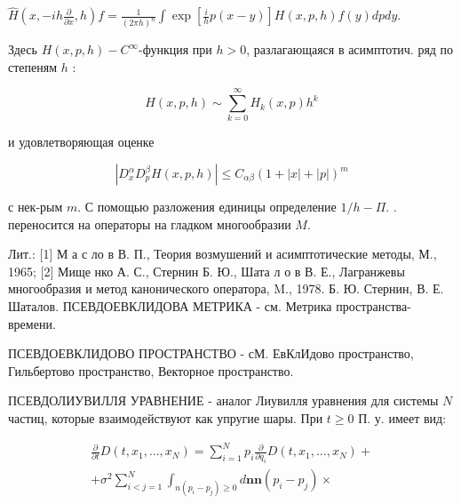 \documentclass[10pt]{article}
\begin{document}
$\hat{H}\left(x,-i h \frac{\partial}{\partial x}, h\right) f=\frac{1}{(2 \pi h)^{n}} \int \exp \left[\frac{i}{h} p(x-y)\right] H(x, p, h) f(y) d p d y$.



Здесь $H(x, p, h)-C^{\infty}$-функция при $h>0$, разлагающаяся в асимптотич. ряд по степеням $h$ :



\[

H(x, p, h) \sim \sum_{k=0}^{\infty} H_{k}(x, p) h^{k}

\]



и удовлетворяющая оценке



\[

\left|D_{x}^{\alpha} D_{p}^{\beta} H(x, p, h)\right| \leqslant C_{\alpha \beta}(1+|x|+|p|)^{m}

\]



с нек-рым $m$. С помощью разложения единицы определение $1 / h-\Pi$. . переносится на операторы на гладком многообразии $M$.



Лит.: [1] М а с ло в В. П., Теория возмушений и асимптотические методы, М., 1965; [2] Мище нко А. С., Стернин Б. Ю., Шата л о в В. Е., Лагранжевы многообразия и метод канонического оператора, M., 1978. Б. Ю. Стернин, В. Е. Шаталов. ПСЕВДОЕВКЛИДОВА МЕТРИКА - см. Метрика пространства-времени.



ПСЕВДОЕВКЛИДОВО ПРОСТРАНСТВО - сМ. ЕвКлИдово пространство, Гильбертово пространство, Векторное пространство.



ПСЕВДОЛИУВИЛЛЯ УРАВНЕНИЕ - аналог Лиувилля уравнения для системы $N$ частиц, которые взаимодействуют как упругие шары. При $t \geqslant 0$ П. у. имеет вид:



\[

\begin{gathered}

\frac{\partial}{\partial t} D\left(t, x_{1}, \ldots, x_{N}\right)=\sum_{i=1}^{N} p_{i} \frac{\partial}{\partial q_{i}} D\left(t, x_{1}, \ldots, x_{N}\right)+ \\

+\sigma^{2} \sum_{i<j=1}^{N} \int_{n\left(p_{i}-p_{j}\right) \geqslant 0} d \boldsymbol{n} \boldsymbol{n}\left(p_{i}-p_{j}\right) \times

\end{gathered}

\]
\end{document}
